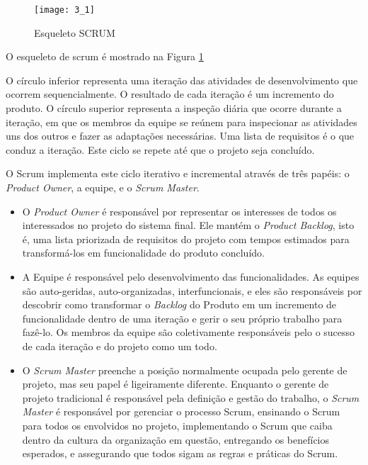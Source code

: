 \begin{figure}[H]
    \centering
\texttt{[image: 3\_1]}
    \caption{Esqueleto SCRUM}
    \label{scrumesqueleto}
\end{figure}

O esqueleto de scrum é mostrado na Figura \ref{scrumesqueleto} \cite{book:schwaber}

O círculo inferior representa uma iteração das atividades de desenvolvimento que ocorrem sequencialmente. O resultado de cada iteração é um incremento do produto. O círculo superior representa a inspeção diária que ocorre durante a iteração, em que os membros da equipe se reúnem para inspecionar as atividades uns dos outros e fazer as adaptações necessárias. Uma lista de requisitos é o que conduz a iteração. Este ciclo se repete até que o projeto seja concluído.

O Scrum implementa este ciclo iterativo e incremental através de três papéis: o \textit{Product Owner}, a equipe, e o \textit{Scrum Master}.


\begin{itemize}
    \item O \textit{Product Owner} é responsável por representar os interesses de todos os interessados no projeto do sistema final. Ele mantém o \textit{Product Backlog}, isto é, uma lista priorizada de requisitos do projeto com tempos estimados para transformá-los em funcionalidade do produto concluído.
    \item A Equipe é responsável pelo desenvolvimento das funcionalidades. As equipes são auto-geridas, auto-organizadas, interfuncionais, e eles são responsáveis por descobrir como transformar o \textit{Backlog} do Produto em um incremento de funcionalidade dentro de uma iteração e gerir o seu próprio trabalho para fazê-lo. Os membros da equipe são coletivamente responsáveis pelo o sucesso de cada iteração e do projeto como um todo.
    \item O \textit{Scrum Master} preenche a posição normalmente ocupada pelo gerente de projeto, mas seu papel é ligeiramente diferente. Enquanto o gerente de projeto tradicional é responsável pela definição e gestão do trabalho, o \textit{Scrum Master} é responsável por gerenciar o processo Scrum, ensinando o Scrum para todos os envolvidos no projeto, implementando o Scrum que caiba dentro da cultura da organização em questão, entregando os benefícios esperados, e assegurando que todos sigam as regras e práticas do Scrum.
\end{itemize}

